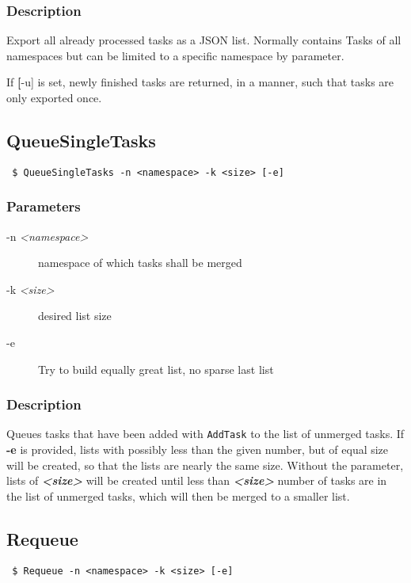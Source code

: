 \documentclass[a4paper,11pt]{article}
\begin{document}
\subsubsection{Description}
Export all already processed tasks as a JSON list. Normally contains Tasks of all namespaces but can be limited to a specific namespace by parameter.

If \textbf[-u] is set, newly finished tasks are returned, in a manner, such that tasks are only exported once.

\newpage

\subsection{QueueSingleTasks\label{cmd:QueueSingleTasks}}
\begin{verbatim}
 $ QueueSingleTasks -n <namespace> -k <size> [-e]
\end{verbatim}

\subsubsection{Parameters}
\begin{description}
\item[-n \textit{<namespace>}] namespace of which tasks shall be merged
\item[-k \textit{<size>}] desired list size
\item[-e] Try to build equally great list, no sparse last list
\end{description}

\subsubsection{Description}
Queues tasks that have been added with \texttt{AddTask} to the list of unmerged tasks. If \textbf{-e} is provided, lists with possibly less than the given number, but of equal size will be created, so that the lists are nearly the same size. Without the parameter, lists of \textbf{\textit{<size>}} will be created until less than \textbf{\textit{<size>}} number of tasks are in the list of unmerged tasks, which will then be merged to a smaller list.


\newpage


\subsection{Requeue\label{cmd:Requeue}}
\begin{verbatim}
 $ Requeue -n <namespace> -k <size> [-e]
\end{verbatim}
\end{document}
